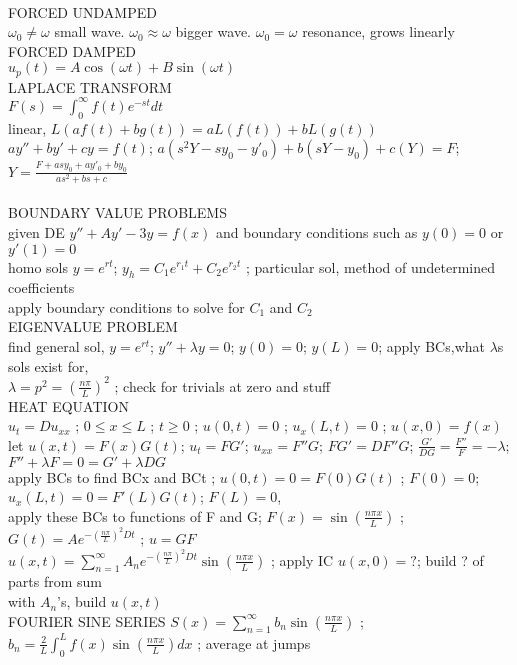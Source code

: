 \documentclass{article}
\begin{document}
\begin{large}
\\FORCED UNDAMPED
\\$\omega_0\ne\omega$ small wave. $\omega_0\approx\omega$ bigger wave. $\omega_0=\omega$ resonance, grows linearly
\\FORCED DAMPED
\\$u_p(t)=A\cos(\omega t)+B\sin(\omega t)$
\\LAPLACE TRANSFORM
\\$F(s)=\int_0^\infty f(t)e^{-st} dt$
\\linear, $L(af(t)+bg(t))=aL(f(t))+bL(g(t))$
\\$ay''+by'+cy=f(t)$; $a(s^2Y-sy_0-y'_0)+b(sY-y_0)+c(Y)=F$; $Y=\frac{F+asy_0+ay'_0+by_0}{as^2+bs+c}$
\\
\\BOUNDARY VALUE PROBLEMS
\\given DE $y''+Ay'-3y=f(x)$ and boundary conditions such as $y(0)=0$ or $y'(1)=0$
\\homo sols $y=e^{rt}$; $y_h=C_1e^{r_1t}+C_2e^{r_2t}$ ; particular sol, method of undetermined coefficients
\\apply boundary conditions to solve for $C_1$ and $C_2$
\\EIGENVALUE PROBLEM
\\find general sol, $y=e^{rt}$; $y''+\lambda y=0$; $y(0)=0$; $y(L)=0$; apply BCs,what $\lambda$s sols exist for, 
\\$\lambda=p^2=(\frac{n\pi}{L})^2$ ; check for trivials at zero and stuff
\\HEAT EQUATION
\\$u_t=Du_{xx}$ ; $0\le x\le L$ ; $t\ge0$ ; $u(0,t)=0$ ; $u_x(L,t)=0$ ; $u(x,0)=f(x)$
\\let $u(x,t)=F(x)G(t)$; $u_t=FG'$; $u_{xx}=F''G$; $FG'=DF''G$; $\frac{G'}{DG}=\frac{F''}{F}=-\lambda$; $F''+\lambda F=0=G'+\lambda DG$
\\apply BCs to find BCx and BCt ; $u(0,t)=0=F(0)G(t)$ ; $F(0)=0$; $u_x(L,t)=0=F'(L)G(t)$; $F(L)=0$, 
\\apply these BCs to functions of F and G; $F(x)=\sin(\frac{n\pi x}{L})$ ; $G(t)=Ae^{-(\frac{n\pi}{L})^2Dt}$ ; $u=GF$
\\$u(x,t)=\sum_{n=1}^\infty A_ne^{-(\frac{n\pi}{L})^2Dt}\sin(\frac{n\pi x}{L})$ ; apply IC $u(x,0)=?$; build ? of parts from sum
\\with $A_n$'s, build $u(x,t)$
\\FOURIER SINE SERIES $S(x)=\sum_{n=1}^\infty b_n\sin(\frac{n\pi x}{L})$ ; $b_n=\frac{2}{L}\int_0^Lf(x)\sin(\frac{n\pi x}{L})dx$ ; average at jumps

\end{large}
\end{document}
